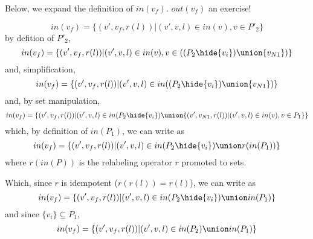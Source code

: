Below, we expand the definition of $in(v_f)$. $out(v_f)$ an exercise!

\[
in(v_f) = \{(v',v_f,r(l))|(v',v,l) \in in(v), v\in P'_2\}
\]
by defition of $P'_2$,
\[
in(v_f) = \{(v',v_f,r(l))|(v',v,l) \in in(v), v\in((P_2\hide\{v_i\})\union\{v_{N1}\})\}
\]
and,  simplification, 
\[
in(v_f) = \{(v',v_f,r(l))|(v',v,l) \in in((P_2\hide\{v_i\}) \union \{v_{N1}\})\}
\]
and, by set manipulation, 
\[
in(v_f) = \{(v',v_f,r(l))|(v',v,l) \in in(P_2\hide\{v_i\}) \union  \{(v',v_{N1},r(l))|(v',v,l)\in in(v), v\in P_1\}\}
\]
which, by definition of $in(P_1)$, we can write as
\[
in(v_f) = \{(v',v_f,r(l))|(v',v,l) \in in(P_2\hide\{v_i\}) \union  r(in(P_1))\}
\]
where $r(in(P))$ is the relabeling operator $r$ promoted to sets. 

Which, since $r$ is idempotent ($r(r(l)) = r(l)$), we can write as
\[
in(v_f) = \{(v',v_f,r(l))|(v',v,l) \in in(P_2\hide\{v_i\}) \union  in(P_1)\}
\]
and since $\{v_i\} \subseteq P_1$, 
\[
in(v_f) = \{(v',v_f,r(l))|(v',v,l) \in in(P_2) \union  in(P_1)\}
\]


\pagebreak


